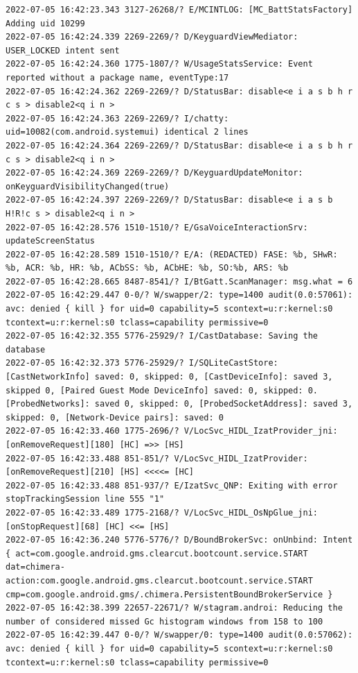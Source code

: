 \documentclass[a4paper,12pt]{book}
\begin{document}
\begin{lstlisting}
2022-07-05 16:42:23.343 3127-26268/? E/MCINTLOG: [MC_BattStatsFactory] Adding uid 10299
2022-07-05 16:42:24.339 2269-2269/? D/KeyguardViewMediator: USER_LOCKED intent sent
2022-07-05 16:42:24.360 1775-1807/? W/UsageStatsService: Event reported without a package name, eventType:17
2022-07-05 16:42:24.362 2269-2269/? D/StatusBar: disable<e i a s b h r c s > disable2<q i n >
2022-07-05 16:42:24.363 2269-2269/? I/chatty: uid=10082(com.android.systemui) identical 2 lines
2022-07-05 16:42:24.364 2269-2269/? D/StatusBar: disable<e i a s b h r c s > disable2<q i n >
2022-07-05 16:42:24.369 2269-2269/? D/KeyguardUpdateMonitor: onKeyguardVisibilityChanged(true)
2022-07-05 16:42:24.397 2269-2269/? D/StatusBar: disable<e i a s b H!R!c s > disable2<q i n >
2022-07-05 16:42:28.576 1510-1510/? E/GsaVoiceInteractionSrv: updateScreenStatus
2022-07-05 16:42:28.589 1510-1510/? E/A: (REDACTED) FASE: %b, SHwR: %b, ACR: %b, HR: %b, ACbSS: %b, ACbHE: %b, SO:%b, ARS: %b
2022-07-05 16:42:28.665 8487-8541/? I/BtGatt.ScanManager: msg.what = 6
2022-07-05 16:42:29.447 0-0/? W/swapper/2: type=1400 audit(0.0:57061): avc: denied { kill } for uid=0 capability=5 scontext=u:r:kernel:s0 tcontext=u:r:kernel:s0 tclass=capability permissive=0
2022-07-05 16:42:32.355 5776-25929/? I/CastDatabase: Saving the database
2022-07-05 16:42:32.373 5776-25929/? I/SQLiteCastStore: [CastNetworkInfo] saved: 0, skipped: 0, [CastDeviceInfo]: saved 3, skipped 0, [Paired Guest Mode DeviceInfo] saved: 0, skipped: 0. [ProbedNetworks]: saved 0, skipped: 0, [ProbedSocketAddress]: saved 3, skipped: 0, [Network-Device pairs]: saved: 0
2022-07-05 16:42:33.460 1775-2696/? V/LocSvc_HIDL_IzatProvider_jni: [onRemoveRequest][180] [HC] =>> [HS]
2022-07-05 16:42:33.488 851-851/? V/LocSvc_HIDL_IzatProvider: [onRemoveRequest][210] [HS] <<<<= [HC]
2022-07-05 16:42:33.488 851-937/? E/IzatSvc_QNP: Exiting with error stopTrackingSession line 555 "1"
2022-07-05 16:42:33.489 1775-2168/? V/LocSvc_HIDL_OsNpGlue_jni: [onStopRequest][68] [HC] <<= [HS]
2022-07-05 16:42:36.240 5776-5776/? D/BoundBrokerSvc: onUnbind: Intent { act=com.google.android.gms.clearcut.bootcount.service.START dat=chimera-action:com.google.android.gms.clearcut.bootcount.service.START cmp=com.google.android.gms/.chimera.PersistentBoundBrokerService }
2022-07-05 16:42:38.399 22657-22671/? W/stagram.androi: Reducing the number of considered missed Gc histogram windows from 158 to 100
2022-07-05 16:42:39.447 0-0/? W/swapper/0: type=1400 audit(0.0:57062): avc: denied { kill } for uid=0 capability=5 scontext=u:r:kernel:s0 tcontext=u:r:kernel:s0 tclass=capability permissive=0

\end{lstlisting}
\end{document}
